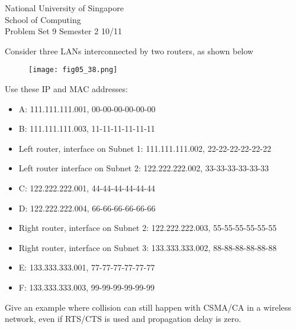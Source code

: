 \documentclass[a4paper,11pt]{exam}
\begin{document}
    \extraheadheight{.5in}
    {\large\sf National University of Singapore\\ School of Computing \\
    \LARGE\sf Problem Set 9}%
    {\large\sf Semester 2 10/11}
    \firstpageheadrule
    \pagestyle{headandfoot}

    \begin{questions}
	\question 
	Consider three LANs interconnected by two routers, as shown below
	\begin{figure}
	\texttt{[image: fig05\_38.png]}
	\end{figure}
	Use these IP and MAC addresses:
	\begin{itemize}
		\item A: 111.111.111.001, 00-00-00-00-00-00
		\item B: 111.111.111.003, 11-11-11-11-11-11
		\item Left router, interface on Subnet 1: 111.111.111.002, 22-22-22-22-22-22
		\item Left router interface on Subnet 2: 122.222.222.002, 33-33-33-33-33-33
		\item C: 122.222.222.001, 44-44-44-44-44-44
		\item D: 122.222.222.004, 66-66-66-66-66-66
		\item 	Right router, interface on Subnet 2: 122.222.222.003, 55-55-55-55-55-55
		\item 	Right router, interface on Subnet 3: 133.333.333.002, 88-88-88-88-88-88
		\item 	E: 133.333.333.001, 77-77-77-77-77-77
		\item 	F: 133.333.333.003, 99-99-99-99-99-99
	\end{itemize}

\question 
Give an example where collision can still happen with CSMA/CA in a wireless network, even if RTS/CTS is used and propagation delay is zero.  

    \end{questions}
\end{document}
